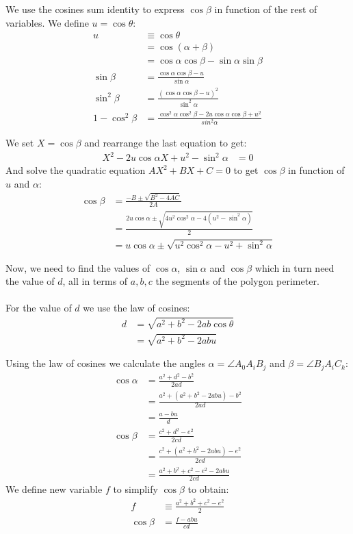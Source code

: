 \documentclass[11pt]{article}
\begin{document}
We use the cosines sum identity to express $\cos\beta$ in function of the rest of variables.
We define $u = \cos\theta$:
\begin{align}
u &\equiv \cos\theta\\
 &= \cos(\alpha + \beta)\\
 &= \cos\alpha\cos\beta - \sin\alpha\sin\beta\\
\sin\beta &= \frac{\cos\alpha\cos\beta - u}{\sin\alpha}\\
\sin^2\beta &= \frac{(\cos\alpha\cos\beta - u)^2}{\sin^2\alpha}\\
1 - \cos^2\beta &= \frac{\cos^2\alpha\cos^2\beta - 2u\cos\alpha\cos\beta + u^2}{sin^2\alpha}
\end{align}

We set $X = \cos\beta$ and rearrange the last equation to get:
\begin{align}
X^2 - 2u\cos\alpha X + u^2 - \sin^2\alpha &= 0
\end{align}
And solve the quadratic equation $AX^2 + BX + C = 0$ to get $\cos\beta$
in function of $u$ and $\alpha$:
\begin{align}
\cos\beta &= \frac{-B \pm \sqrt{B^2 - 4AC}}{2A}\nonumber\\
 &= \frac{2u\cos\alpha \pm 
 \sqrt{4u^2\cos^2\alpha - 4(u^2 -\sin^2\alpha)}}{2}\nonumber\\
 &= u\cos\alpha \pm \sqrt{u^2\cos^2\alpha - u^2 + \sin^2\alpha} \label{eq:cosbeta}
\end{align}

Now, we need to find the values of $\cos\alpha$, $\sin\alpha$ and $\cos\beta$ which
in turn need the value of $d$, all in terms of $a,b,c$ the segments of the polygon perimeter.
\\\\
For the value of $d$ we use the law of cosines:
\begin{align}
d &= \sqrt{a^2 + b^2 - 2ab\cos\theta} \nonumber\\
 &= \sqrt{a^2 + b^2 - 2abu} \label{eq:d}
\end{align}

Using the law of cosines we calculate the angles $\alpha =\angle{A_0A_iB_j}$ 
and $\beta =\angle{B_jA_iC_k}$:
\begin{align}
\cos\alpha &= \frac{a^2 + d^2 - b^2}{2ad} \nonumber\\
 &= \frac{a^2 + (a^2 + b^2 - 2abu) - b^2}{2ad}\nonumber \\
 &= \frac{a - bu}{d}\\
%
\cos\beta &= \frac{c^2 + d^2 - e^2}{2cd}\nonumber\\
 &= \frac{c^2 + (a^2 + b^2 - 2abu) - e^2}{2cd}\nonumber\\
 &= \frac{a^2 + b^2 + c^2 - e^2 - 2abu}{2cd}
\end{align}
We define new variable $f$ to simplify $\cos\beta$ to obtain:
\begin{align}
f &\equiv \frac{a^2 + b^2 + c^2 - e^2}{2} \label{eq:fequiv} \\
\cos\beta &= \frac{f - abu}{cd}
\end{align}
\end{document}
